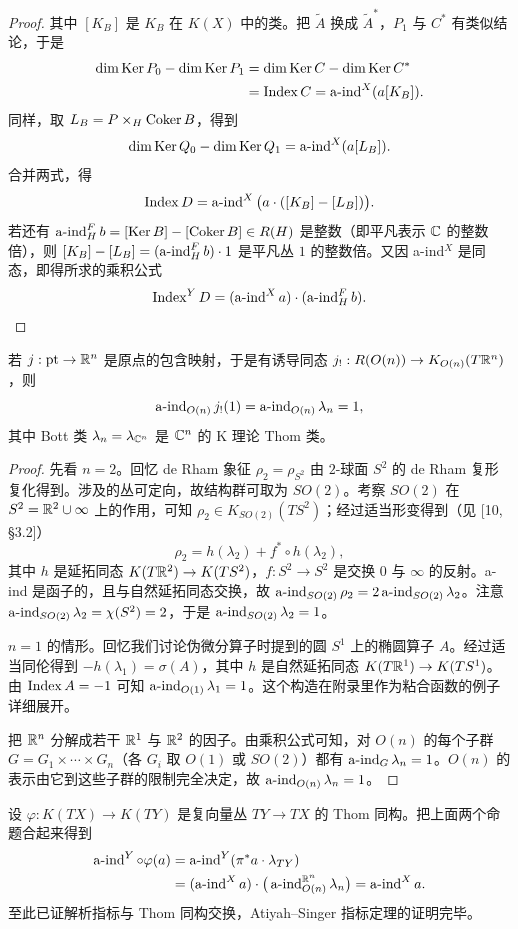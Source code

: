 \begin{proof}
其中 $[K_B]$ 是 $K_B$ 在 $K(X)$ 中的类。把 $\tilde A$ 换成 $\tilde A^*$，$P_1$ 与 $C^*$ 有类似结论，于是
\[
\begin{aligned}
\dim\operatorname{Ker} P_0-\dim\operatorname{Ker} P_1
&=\dim\operatorname{Ker} C-\dim\operatorname{Ker} C^*\\
&=\operatorname{Index} C=\operatorname{a\text{-}ind}^X(a[K_B]).
\end{aligned}
\]
同样，取 $L_B=P\times_H\operatorname{Coker} B$，得到
\[
\dim\operatorname{Ker} Q_0-\dim\operatorname{Ker} Q_1=\operatorname{a\text{-}ind}^X(a[L_B]).
\]
合并两式，得
\[
\operatorname{Index} D=\operatorname{a\text{-}ind}^X\big(a\cdot([K_B]-[L_B])\big).
\]
若还有 $\operatorname{a\text{-}ind}_H^F b=[\operatorname{Ker} B]-[\operatorname{Coker} B]\in R(H)$ 是整数（即平凡表示 $\mathbb{C}$ 的整数倍），则 $[K_B]-[L_B]=(\operatorname{a\text{-}ind}_H^F b)\cdot 1$ 是平凡丛 $1$ 的整数倍。又因 a-ind$^X$ 是同态，即得所求的乘积公式
\[
\operatorname{Index}^Y D=(\operatorname{a\text{-}ind}^X a)\cdot(\operatorname{a\text{-}ind}_H^F b).
\]
\end{proof}

\begin{proposition}[归一化公理]
若 $j:\mathrm{pt}\to\mathbb{R}^n$ 是原点的包含映射，于是有诱导同态 $j_!:R(O(n))\to K_{O(n)}(T\mathbb{R}^n)$，则
\[
\operatorname{a\text{-}ind}_{O(n)}j_!(1)=\operatorname{a\text{-}ind}_{O(n)}\lambda_n=1,
\]
其中 Bott 类 $\lambda_n=\lambda_{\mathbb{C}^n}$ 是 $\mathbb{C}^n$ 的 K 理论 Thom 类。
\end{proposition}

\begin{proof}
先看 $n=2$。回忆 de Rham 象征 $\rho_2=\rho_{S^2}$ 由 $2$-球面 $S^2$ 的 de Rham 复形复化得到。涉及的丛可定向，故结构群可取为 $SO(2)$。考察 $SO(2)$ 在 $S^2=\mathbb{R}^2\cup\infty$ 上的作用，可知 $\rho_2\in K_{SO(2)}(TS^2)$；经过适当形变得到（见 [10, §3.2]）
\[
\rho_2=h(\lambda_2)+f^*\circ h(\lambda_2),
\]
其中 $h$ 是延拓同态 $K(T\mathbb{R}^2)\to K(TS^2)$，$f:S^2\to S^2$ 是交换 $0$ 与 $\infty$ 的反射。a-ind 是函子的，且与自然延拓同态交换，故 $\operatorname{a\text{-}ind}_{SO(2)}\rho_2=2\operatorname{a\text{-}ind}_{SO(2)}\lambda_2$。注意 $\operatorname{a\text{-}ind}_{SO(2)}\lambda_2=\chi(S^2)=2$，于是 $\operatorname{a\text{-}ind}_{SO(2)}\lambda_2=1$。


$n=1$ 的情形。回忆我们讨论伪微分算子时提到的圆 $S^1$ 上的椭圆算子 $A$。经过适当同伦得到 $-h(\lambda_1)=\sigma(A)$，其中 $h$ 是自然延拓同态 $K(T\mathbb{R}^1)\to K(TS^1)$。由 $\operatorname{Index} A=-1$ 可知 $\operatorname{a\text{-}ind}_{O(1)}\lambda_1=1$。这个构造在附录里作为粘合函数的例子详细展开。

把 $\mathbb{R}^n$ 分解成若干 $\mathbb{R}^1$ 与 $\mathbb{R}^2$ 的因子。由乘积公式可知，对 $O(n)$ 的每个子群 $G=G_1\times\cdots\times G_n$（各 $G_i$ 取 $O(1)$ 或 $SO(2)$）都有 $\operatorname{a\text{-}ind}_G\lambda_n=1$。$O(n)$ 的表示由它到这些子群的限制完全决定，故 $\operatorname{a\text{-}ind}_{O(n)}\lambda_n=1$。
\end{proof}

设 $\varphi:K(TX)\to K(TY)$ 是复向量丛 $TY\to TX$ 的 Thom 同构。把上面两个命题合起来得到
\[
\begin{aligned}
\operatorname{a\text{-}ind}^Y\circ\varphi(a)
&=\operatorname{a\text{-}ind}^Y(\pi^*a\cdot\lambda_{TY})\\
&=(\operatorname{a\text{-}ind}^X a)\cdot\big(\operatorname{a\text{-}ind}_{O(n)}^{\mathbb{R}^n}\lambda_n\big)=\operatorname{a\text{-}ind}^X a.
\end{aligned}
\]
至此已证解析指标与 Thom 同构交换，Atiyah–Singer 指标定理的证明完毕。
